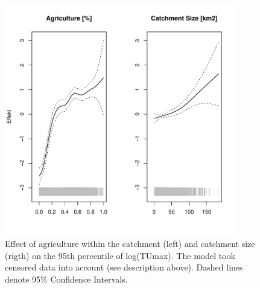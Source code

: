 \documentclass[pdftex,a4paper]{scrreprt}
\begin{document}
\begin{figure}[h]
	\centering
	\includegraphics[width = 0.9\textwidth]{ezgagritumodel}
	\caption{Effect of agriculture within the catchment (left) and catchment size (rigth) on the 95th percentile of log(TUmax). The model took censored data into account (see description above). Dashed lines denote 95\% Confidence Intervals.}
	\label{fig:ezgagritu_model}
\end{figure}




\end{document}
